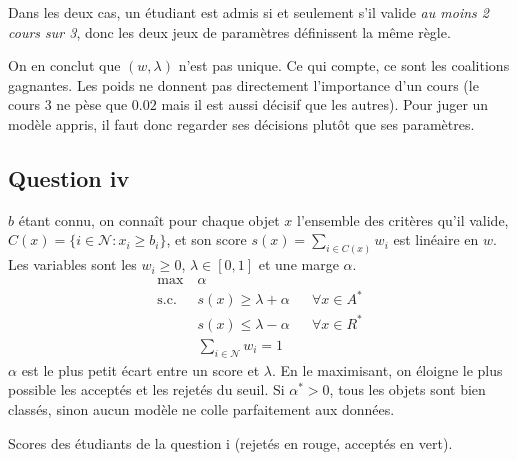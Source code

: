 \documentclass[10pt,a4paper]{article}
\newcommand{\N}{\mathcal{N}}
\begin{document}
Dans les deux cas, un étudiant est admis si et seulement s'il valide \emph{au moins 2 cours sur 3}, donc
les deux jeux de paramètres définissent la même règle.

On en conclut que $(w,\lambda)$ n'est pas unique. Ce qui compte, ce sont les coalitions gagnantes. Les poids ne
donnent pas directement l'importance d'un cours (le cours 3 ne pèse que $0.02$ mais il est aussi décisif que les autres).
Pour juger un modèle appris, il faut donc regarder ses décisions plutôt que ses paramètres.

\subsection*{Question iv}

$b$ étant connu, on connaît pour chaque objet $x$ l'ensemble des critères qu'il valide, $C(x)=\{i\in\N : x_i\geq b_i\}$,
et son score $s(x)=\sum_{i\in C(x)} w_i$ est linéaire en $w$. Les variables sont les $w_i\geq 0$, $\lambda\in[0,1]$ et une marge $\alpha$.
\begin{align*}
\max\ & \alpha \\
\text{s.c.}\ & s(x) \geq \lambda + \alpha && \forall x\in A^* \\
& s(x) \leq \lambda - \alpha && \forall x\in R^* \\
& \textstyle\sum_{i\in\N} w_i = 1
\end{align*}
$\alpha$ est le plus petit écart entre un score et $\lambda$. En le maximisant, on éloigne le plus possible les acceptés et
les rejetés du seuil. Si $\alpha^*>0$, tous les objets sont bien classés, sinon aucun modèle ne colle parfaitement aux données.

\begin{center}

\footnotesize Scores des étudiants de la question i (rejetés en rouge, acceptés en vert).
\end{center}
\end{document}
